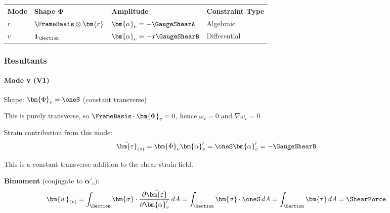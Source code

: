 \begin{longtable}[]{@{}
  >{\raggedright\arraybackslash}p{}
  >{\raggedright\arraybackslash}p{}
  >{\raggedright\arraybackslash}p{}
  >{\raggedright\arraybackslash}p{}@{}}
\toprule\noalign{}
\begin{minipage}[b]{\linewidth}\raggedright
Mode
\end{minipage} & \begin{minipage}[b]{\linewidth}\raggedright
Shape \(\bm{\Phi}\)
\end{minipage} & \begin{minipage}[b]{\linewidth}\raggedright
Amplitude
\end{minipage} & \begin{minipage}[b]{\linewidth}\raggedright
Constraint Type
\end{minipage} \\
\midrule\noalign{}
\endhead
\bottomrule\noalign{}
\endlastfoot
\(r\) & \(\FrameBasis\otimes\bm{r}\) &
\(\bm{\alpha}_r = -\GaugeShearA\) & Algebraic \\
\(v\) & \(\mathbf{1}_{\Section}\) & \(\bm{\alpha}_v = -x\GaugeShearB\) &
Differential \\
\end{longtable}

\subsubsection{Resultants}
\paragraph{Mode v (V1)}

Shape: \(\bm{\Phi}_v = \oneS\) (constant transverse)

This is purely transverse, so \(\FrameBasis\cdot\bm{\Phi}_v = 0\), hence
\(\omega_v = 0\) and \(\nabla\omega_v = 0\).

Strain contribution from this mode:
\[\hat{\bm{\varepsilon}}_{(v)} = \bm{\Phi}_v\bm{\alpha}'_v = \oneS\bm{\alpha}'_v = -\GaugeShearB\]

This is a constant transverse addition to the shear strain field.

\textbf{Bimoment} (conjugate to \(\bm{\alpha}'_v\)):
\[\bm{w}_{(v)} = \int_{\Section} \bm{\sigma} \cdot \frac{\partial\hat{\bm{\varepsilon}}}{\partial\bm{\alpha}'_v} \, dA = \int_{\Section} \bm{\sigma} \cdot \oneS \, dA = \int_{\Section} \bm{\tau} \, dA = \ShearForce\]

